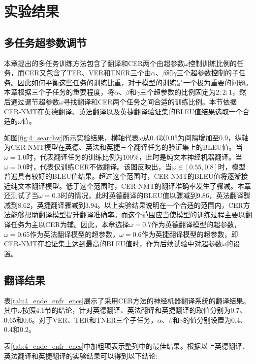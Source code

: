 \section{实验结果}

\subsection{多任务超参数调节}
\label{sec:4_omega}
本章提出的多任务训练方法包含了翻译和CER两个由超参数$\omega$控制训练比例的任务，而CER又包含了TER、VER和TNER三个由$\alpha$、$\beta$和$\gamma$三个超参数控制的子任务。因此如何平衡这些任务的训练比重，对于模型的训练是一个极为重要的问题。本章根据三个子任务的重要程度，将$\alpha$、$\beta$和$\gamma$三个超参数的比例固定为$2:2:1$，然后通过调节超参数$\omega$寻找翻译和CER两个任务之间合适的训练比例。本节依据CER-NMT在英德翻译、英法翻译以及英捷翻译验证集的BLEU值结果选取一个合适的$\omega$值。


如图\ref{fig:4_searchw}所示实验结果，横轴代表$\omega$从0.4以0.05为间隔增加至0.9，纵轴为CER-NMT模型在英德、英法和英捷三个翻译任务的验证集上的BLEU值。当$\omega=1.0$时，代表翻译任务的训练比例为$100\%$，此时是纯文本神经机器翻译。当$\omega=0.0$时，代表仅训练CER不做翻译。该图反映出，当$\omega \in [0.55,0.8]$时，模型普遍具有较好的BLEU值结果。超过这个范围时，CER-NMT的BLEU值将逐渐接近纯文本翻译模型。低于这个范围时，CER-NMT的翻译准确率发生了骤减。本章还测试了当$\omega=0.3$时的情况，此时英德翻译的BLEU值以骤减到9.86，英法翻译骤减到8.62，英捷翻译骤减到3.94。以上实验结果说明在一个合适的范围内，CER方法能够帮助翻译模型提升翻译准确率。而这个范围应当使模型的训练过程主要以翻译任务为主以CER为辅。因此，本章选择$\omega=0.7$作为英德翻译模型的超参数，$\omega=0.65$作为英法翻译模型的超参数，$\omega=0.6$作为英捷翻译模型的超参数，即CER-NMT在验证集上达到最高的BLEU值时，作为后续试验中对超参数$\omega$的设置。


\subsection{翻译结果}
\label{sec:4_translation_results}



表\ref{tab:4_ende_enfr_encs}展示了采用CER方法的神经机器翻译系统的翻译结果。其中$\omega$按照4.1节的结论，针对英德翻译、英法翻译和英捷翻译的取值分别为0.7、0.65和0.6。对于VER、TER和TNER三个子任务，$\alpha$、$\beta$和$\gamma$的值分别设置为0.4、0.4和0.2。


表\ref{tab:4_ende_enfr_encs}中加粗项表示整列中的最佳结果。根据以上英德翻译、英法翻译和英捷翻译的实验结果可以得到以下结论:

